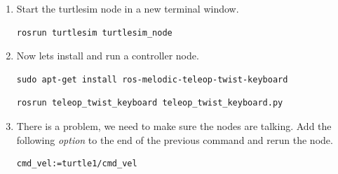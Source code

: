 \documentclass[12pt]{article}
\begin{document}
\begin{description}
\begin{enumerate}
\item Start the turtlesim node in a new terminal window.

\begin{verbatim}
rosrun turtlesim turtlesim_node
\end{verbatim}
%
%	

			
\item Now lets install and run a controller node.
\begin{verbatim}
sudo apt-get install ros-melodic-teleop-twist-keyboard
\end{verbatim}

\begin{verbatim}
rosrun teleop_twist_keyboard teleop_twist_keyboard.py
\end{verbatim}
			
\item There is a problem, we need to make sure the nodes are talking. Add the following {\it option} to the end of the previous command and rerun the node. 
\begin{verbatim}
cmd_vel:=turtle1/cmd_vel
\end{verbatim}
			
        \end{enumerate}  
\end{description}
\end{document}
